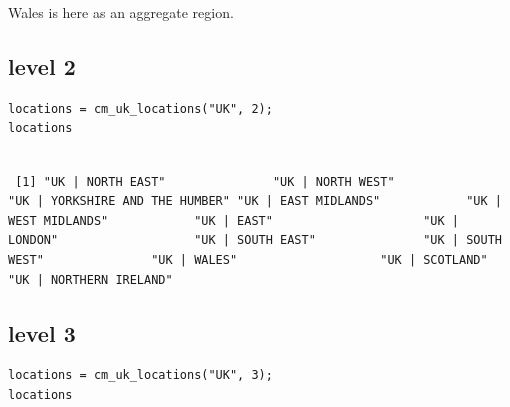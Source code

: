 \documentclass[11pt]{article}
\begin{document}
Wales is here as an aggregate region.

\subsection{level 2}
\label{sec:org6eb0a75}
\begin{verbatim}
locations = cm_uk_locations("UK", 2);
locations
\end{verbatim}

\begin{verbatim}

 [1] "UK | NORTH EAST"               "UK | NORTH WEST"               "UK | YORKSHIRE AND THE HUMBER" "UK | EAST MIDLANDS"            "UK | WEST MIDLANDS"            "UK | EAST"                     "UK | LONDON"                   "UK | SOUTH EAST"               "UK | SOUTH WEST"               "UK | WALES"                    "UK | SCOTLAND"                 "UK | NORTHERN IRELAND"
\end{verbatim}

\subsection{level 3}
\label{sec:org675250e}
\begin{verbatim}
locations = cm_uk_locations("UK", 3);
locations
\end{verbatim}
\end{document}
